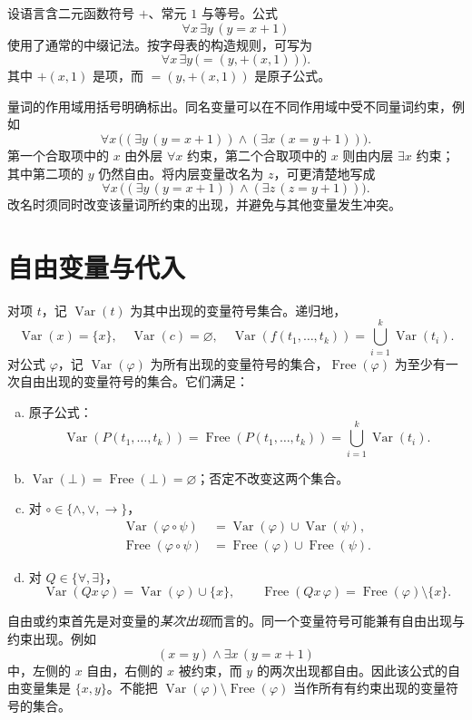 \documentclass[lang=cn,a4paper,fontset=none,zihao=false,10pt,openany,twoside]{beautybook}
\numberwithin{algorithm}{chapter}
\begin{document}
\begin{example}
设语言含二元函数符号 $+$、常元 $1$ 与等号。公式
\[
 \forall x\,\exists y\,(y=x+1)
\]
使用了通常的中缀记法。按字母表的构造规则，可写为
\[
 \forall x\,\exists y\,\bigl(=(y,+(x,1))\bigr).
\]
其中 $+(x,1)$ 是项，而 $=(y,+(x,1))$ 是原子公式。
\end{example}
量词的作用域用括号明确标出。同名变量可以在不同作用域中受不同量词约束，例如
\[
 \forall x\,\bigl((\exists y\,(y=x+1))\wedge
                 (\exists x\,(x=y+1))\bigr).
\]
第一个合取项中的 $x$ 由外层 $\forall x$ 约束，第二个合取项中的 $x$ 则由内层 $\exists x$ 约束；其中第二项的 $y$ 仍然自由。将内层变量改名为 $z$，可更清楚地写成
\[
 \forall x\,\bigl((\exists y\,(y=x+1))\wedge
                 (\exists z\,(z=y+1))\bigr).
\]
改名时须同时改变该量词所约束的出现，并避免与其他变量发生冲突。

\section{自由变量与代入}
\begin{definition}
对项 $t$，记 $\operatorname{Var}(t)$ 为其中出现的变量符号集合。递归地，
\[
 \operatorname{Var}(x)=\{x\},\quad \operatorname{Var}(c)=\varnothing,\quad
 \operatorname{Var}(f(t_1,\ldots,t_k))=\bigcup_{i=1}^k\operatorname{Var}(t_i).
\]
对公式 $\varphi$，记 $\operatorname{Var}(\varphi)$ 为所有出现的变量符号的集合，$\operatorname{Free}(\varphi)$ 为至少有一次自由出现的变量符号的集合。它们满足：
\begin{enumerate}[(a)]
\item 原子公式：
\[
 \operatorname{Var}(P(t_1,\ldots,t_k))
 =\operatorname{Free}(P(t_1,\ldots,t_k))
 =\bigcup_{i=1}^k\operatorname{Var}(t_i).
\]
\item $\operatorname{Var}(\bot)=\operatorname{Free}(\bot)=\varnothing$；否定不改变这两个集合。
\item 对 $\circ\in\{\wedge,\vee,\to\}$，
\begin{align*}
 \operatorname{Var}(\varphi\circ\psi)&=\operatorname{Var}(\varphi)\cup\operatorname{Var}(\psi),\\
 \operatorname{Free}(\varphi\circ\psi)&=\operatorname{Free}(\varphi)\cup\operatorname{Free}(\psi).
\end{align*}
\item 对 $Q\in\{\forall,\exists\}$，
\[
 \operatorname{Var}(Qx\,\varphi)=\operatorname{Var}(\varphi)\cup\{x\},\qquad
 \operatorname{Free}(Qx\,\varphi)=\operatorname{Free}(\varphi)\setminus\{x\}.
\]
\end{enumerate}
\end{definition}
自由或约束首先是对变量的\emph{某次出现}而言的。同一个变量符号可能兼有自由出现与约束出现。例如
\[
 (x=y)\wedge\exists x\,(y=x+1)
\]
中，左侧的 $x$ 自由，右侧的 $x$ 被约束，而 $y$ 的两次出现都自由。因此该公式的自由变量集是 $\{x,y\}$。不能把 $\operatorname{Var}(\varphi)\setminus\operatorname{Free}(\varphi)$ 当作所有有约束出现的变量符号的集合。
\end{document}
